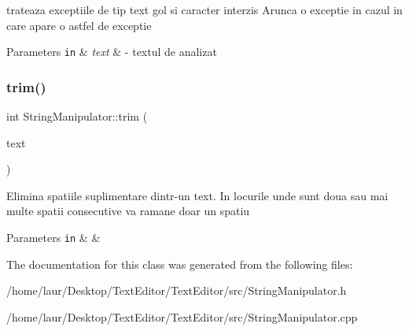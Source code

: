trateaza exceptiile de tip text gol si caracter interzis Arunca o exceptie in cazul in care apare o astfel de exceptie


\begin{DoxyParams}[1]{Parameters}
\mbox{\tt in}  & {\em text} & -\/ textul de analizat \\
\hline
\end{DoxyParams}
\mbox{\label{class_string_manipulator_a254924bbc9bead53372a393aee9f8711}} 
\subsubsection{\texorpdfstring{trim()}{trim()}}
{\footnotesize\ttfamily int String\+Manipulator\+::trim (\begin{DoxyParamCaption}\item[{Q\+String \&}]{text }\end{DoxyParamCaption})\hspace{0.3cm}{\ttfamily [static]}}

Elimina spatiile suplimentare dintr-\/un text. In locurile unde sunt doua sau mai multe spatii consecutive va ramane doar un spatiu


\begin{DoxyParams}[1]{Parameters}
\mbox{\tt in}  & {\em } & \\
\hline
\end{DoxyParams}


The documentation for this class was generated from the following files\+:\begin{DoxyCompactItemize}
\item 
/home/laur/\+Desktop/\+Text\+Editor/\+Text\+Editor/src/String\+Manipulator.\+h\item 
/home/laur/\+Desktop/\+Text\+Editor/\+Text\+Editor/src/String\+Manipulator.\+cpp\end{DoxyCompactItemize}
